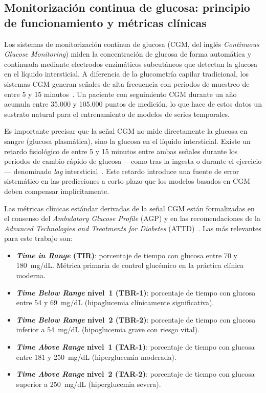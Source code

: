 \subsection{Monitorización continua de glucosa: principio de funcionamiento y métricas clínicas}
\label{subsec:cgm_metricas}

Los sistemas de monitorización continua de glucosa (CGM, del inglés \emph{Continuous Glucose Monitoring}) miden la concentración de glucosa de forma automática y continuada mediante electrodos enzimáticos subcutáneos que detectan la glucosa en el líquido intersticial. A diferencia de la glucometría capilar tradicional, los sistemas CGM generan señales de alta frecuencia con periodos de muestreo de entre 5 y 15 minutos~\cite{klonoff2017cgm}. Un paciente con seguimiento CGM durante un año acumula entre 35.000 y 105.000 puntos de medición, lo que hace de estos datos un sustrato natural para el entrenamiento de modelos de series temporales.

Es importante precisar que la señal CGM no mide directamente la glucosa en sangre (glucosa plasmática), sino la glucosa en el líquido intersticial. Existe un retardo fisiológico de entre 5 y 15 minutos entre ambas señales durante los periodos de cambio rápido de glucosa —como tras la ingesta o durante el ejercicio— denominado \emph{lag} intersticial~\cite{rebrin2000subcutaneous}. Este retardo introduce una fuente de error sistemático en las predicciones a corto plazo que los modelos basados en CGM deben compensar implícitamente.

Las métricas clínicas estándar derivadas de la señal CGM están formalizadas en el consenso del \emph{Ambulatory Glucose Profile} (AGP) y en las recomendaciones de la \emph{Advanced Technologies and Treatments for Diabetes} (ATTD)~\cite{battelino2019clinical}. Las más relevantes para este trabajo son:

\begin{itemize}
    \item \textbf{\emph{Time in Range} (TIR)}: porcentaje de tiempo con glucosa entre 70 y 180~mg/dL. Métrica primaria de control glucémico en la práctica clínica moderna.
    \item \textbf{\emph{Time Below Range} nivel~1 (TBR-1)}: porcentaje de tiempo con glucosa entre 54 y 69~mg/dL (hipoglucemia clínicamente significativa).
    \item \textbf{\emph{Time Below Range} nivel~2 (TBR-2)}: porcentaje de tiempo con glucosa inferior a 54~mg/dL (hipoglucemia grave con riesgo vital).
    \item \textbf{\emph{Time Above Range} nivel~1 (TAR-1)}: porcentaje de tiempo con glucosa entre 181 y 250~mg/dL (hiperglucemia moderada).
    \item \textbf{\emph{Time Above Range} nivel~2 (TAR-2)}: porcentaje de tiempo con glucosa superior a 250~mg/dL (hiperglucemia severa).
\end{itemize}

